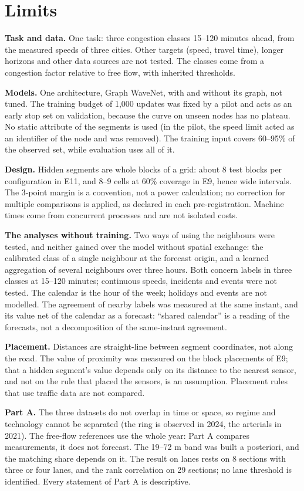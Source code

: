 \section{Limits}
\textbf{Task and data.} One task: three congestion classes 15–120 minutes ahead, from the measured speeds of three cities. Other targets (speed, travel time), longer horizons and other data sources are not tested. The classes come from a congestion factor relative to free flow, with inherited thresholds.

\textbf{Models.} One architecture, Graph WaveNet, with and without its graph, not tuned. The training budget of 1,000 updates was fixed by a pilot and acts as an early stop set on validation, because the curve on unseen nodes has no plateau. No static attribute of the segments is used (in the pilot, the speed limit acted as an identifier of the node and was removed). The training input covers 60–95\% of the observed set, while evaluation uses all of it.

\textbf{Design.} Hidden segments are whole blocks of a grid: about 8 test blocks per configuration in E11, and 8–9 cells at 60\% coverage in E9, hence wide intervals. The 3-point margin is a convention, not a power calculation; no correction for multiple comparisons is applied, as declared in each pre-registration. Machine times come from concurrent processes and are not isolated costs.

\textbf{The analyses without training.} Two ways of using the neighbours were tested, and neither gained over the model without spatial exchange: the calibrated class of a single neighbour at the forecast origin, and a learned aggregation of several neighbours over three hours. Both concern labels in three classes at 15–120 minutes; continuous speeds, incidents and events were not tested. The calendar is the hour of the week; holidays and events are not modelled. The agreement of nearby labels was measured at the same instant, and its value net of the calendar as a forecast: ``shared calendar'' is a reading of the forecasts, not a decomposition of the same-instant agreement.

\textbf{Placement.} Distances are straight-line between segment coordinates, not along the road. The value of proximity was measured on the block placements of E9; that a hidden segment's value depends only on its distance to the nearest sensor, and not on the rule that placed the sensors, is an assumption. Placement rules that use traffic data are not compared.

\textbf{Part A.} The three datasets do not overlap in time or space, so regime and technology cannot be separated (the ring is observed in 2024, the arterials in 2021). The free-flow references use the whole year: Part A compares measurements, it does not forecast. The 19–72 m band was built a posteriori, and the matching share depends on it. The result on lanes rests on 8 sections with three or four lanes, and the rank correlation on 29 sections; no lane threshold is identified. Every statement of Part A is descriptive.

